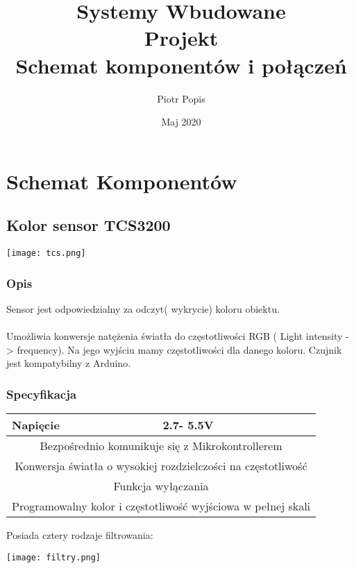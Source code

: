\documentclass[12pt]{article}
\title{Systemy Wbudowane\\
   Projekt\\
   Schemat komponentów i połączeń}
\author{Piotr Popis}
\date{Maj 2020}
\begin{document}
\begin{titlepage}
\maketitle
\end{titlepage}

\section{Schemat Komponentów}
\subsection{Kolor sensor TCS3200}
\begin{center}
\begin{minipage}[H]{.45\textwidth}
    \texttt{[image: tcs.png]}
\end{minipage}
\end{center}
\subsubsection{Opis}
Sensor jest odpowiedzialny za odczyt( wykrycie) koloru obiektu.\\
\\
Umożliwia konwersje natężenia światła do częstotliwości RGB
 ( Light    intensity -> frequency). Na jego wyjściu mamy częstotliwości dla danego koloru. Czujnik jest kompatybilny z Arduino. 
\subsubsection{Specyfikacja}
\begin{center}
\begin{tabular}{ | m{5cm} | m{3cm} | } 
\hline
Napięcie &  2.7- 5.5V\\ 
\hline
\multicolumn{2}{|c|}{Bezpośrednio komunikuje się z Mikrokontrollerem}\\ 
\hline
\multicolumn{2}{|c|}{Konwersja światła o wysokiej rozdzielczości na częstotliwość}\\ 
\hline
\multicolumn{2}{|c|}{Funkcja wyłączania}\\ 
\hline
\multicolumn{2}{|c|}{Programowalny kolor i częstotliwość wyjściowa w pełnej skali}\\ 
\hline
\end{tabular}
\end{center}
Posiada cztery rodzaje filtrowania:\\
\begin{minipage}[H]{.5\textwidth}
    \texttt{[image: filtry.png]}
\end{minipage}
\end{document}

